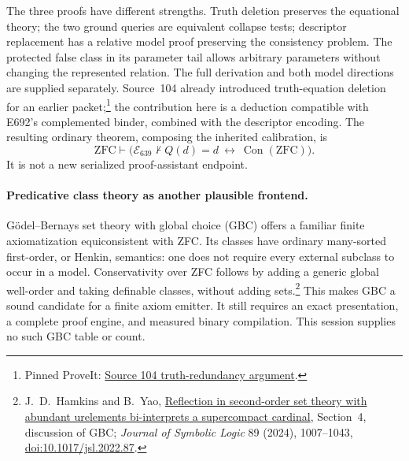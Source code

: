 The three proofs have different strengths.  Truth deletion preserves the
equational theory; the two ground queries are equivalent collapse tests;
descriptor replacement has a relative model proof preserving the
consistency problem.  The protected false class in its parameter tail
allows arbitrary parameters without changing the represented relation.
The full derivation and both model directions are supplied separately.
Source~104 already introduced truth-equation deletion for an earlier
packet;\footnote{Pinned ProveIt:
\href{https://github.com/VladimirReshetnikov/ProveIt/blob/1b27f052d770f4c7d435e82e779bf21f5a1f66ed/SetTheory/Cardinals/docs/reports/set-theory/zfc-closure-kernels/data/104-res238-formalisms-truth_redundancy.md}{Source 104 truth-redundancy argument}.}
the contribution here is a deduction compatible with E692's
complemented binder, combined with the descriptor encoding.  The resulting
ordinary theorem, composing the inherited calibration, is
\[
 \mathrm{ZFC}\vdash
 \bigl(\mathcal E_{639}\nvdash Q(d)=d
       \ \longleftrightarrow\ \operatorname{Con}(\mathrm{ZFC})\bigr).
\]
It is not a new serialized proof-assistant endpoint.

\paragraph{Predicative class theory as another plausible frontend.}
G\"odel--Bernays set theory with global choice (GBC) offers a familiar finite
axiomatization equiconsistent with ZFC.  Its classes have ordinary
many-sorted first-order, or Henkin, semantics: one does not require every
external subclass to occur in a model.  Conservativity over ZFC follows
by adding a generic global well-order and taking definable classes, without
adding sets.\footnote{J.~D.~Hamkins and B.~Yao,
\href{https://arxiv.org/pdf/2204.09766}{Reflection in second-order set
theory with abundant urelements bi-interprets a supercompact cardinal},
Section~4, discussion of GBC; \emph{Journal of Symbolic Logic} 89 (2024), 1007--1043,
\href{https://doi.org/10.1017/jsl.2022.87}{doi:10.1017/jsl.2022.87}.}
This makes GBC a sound candidate for a finite axiom emitter.  It still
requires an exact presentation, a complete proof engine, and measured
binary compilation.  This session supplies no such GBC table or count.

